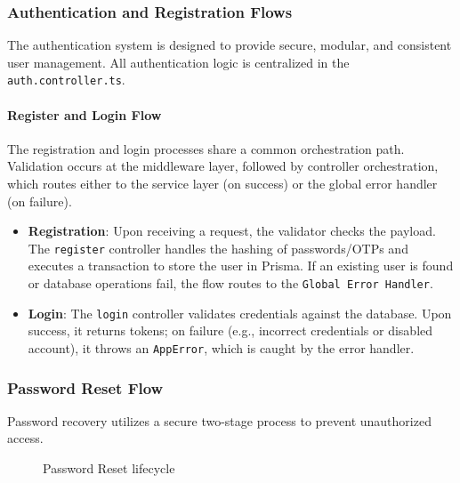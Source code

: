 \subsubsection{Authentication and Registration Flows}

The authentication system is designed to provide secure, modular, and consistent user management. All authentication logic is centralized in the \texttt{auth.controller.ts}.

\paragraph{Register and Login Flow}
The registration and login processes share a common orchestration path. Validation occurs at the middleware layer, followed by controller orchestration, which routes either to the service layer (on success) or the global error handler (on failure).


\begin{itemize}
    \item \textbf{Registration}: Upon receiving a request, the validator checks the payload. The \texttt{register} controller handles the hashing of passwords/OTPs and executes a transaction to store the user in Prisma. If an existing user is found or database operations fail, the flow routes to the \texttt{Global Error Handler}.
    \item \textbf{Login}: The \texttt{login} controller validates credentials against the database. Upon success, it returns tokens; on failure (e.g., incorrect credentials or disabled account), it throws an \texttt{AppError}, which is caught by the error handler.
\end{itemize}

\subsubsection{Password Reset Flow}
Password recovery utilizes a secure two-stage process to prevent unauthorized access.

\begin{figure}[H]
\centering
{}
\caption{Password Reset lifecycle}
\label{fig:reset-flow}
\end{figure}

